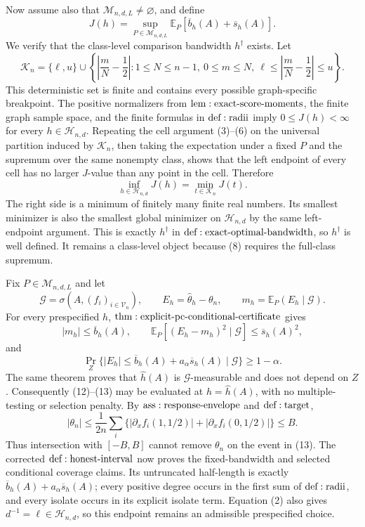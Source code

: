 Now assume also that \(\mathcal M_{n,d,L}\ne\varnothing\), and define
\[
 J(h)=\sup_{P\in\mathcal M_{n,d,L}}
 \mathbb E_P[\overline b_h(A)+\overline s_h(A)].
\tag{8}
\]
We verify that the class-level comparison bandwidth \(h^\dagger\) exists.  Let
\[
 \mathcal K_n=\{\ell,u\}\cup
 \left\{\left|\frac mN-\frac12\right|:
 1\leq N\leq n-1,\ 0\leq m\leq N,\
 \ell\leq\left|\frac mN-\frac12\right|\leq u\right\}.
\tag{9}
\]
This deterministic set is finite and contains every possible graph-specific breakpoint.  The positive normalizers from \({\rm lem:exact\text{-}score\text{-}moments}\), the finite graph sample space, and the finite formulas in \({\rm def:radii}\) imply \(0\leq J(h)<\infty\) for every \(h\in\mathcal H_{n,d}\).  Repeating the cell argument (3)--(6) on the universal partition induced by \(\mathcal K_n\), then taking the expectation under a fixed \(P\) and the supremum over the same nonempty class, shows that the left endpoint of every cell has no larger \(J\)-value than any point in the cell.  Therefore
\[
 \inf_{h\in\mathcal H_{n,d}}J(h)=\min_{t\in\mathcal K_n}J(t).
\tag{10}
\]
The right side is a minimum of finitely many finite real numbers.  Its smallest minimizer is also the smallest global minimizer on \(\mathcal H_{n,d}\) by the same left-endpoint argument.  This is exactly \(h^\dagger\) in \({\rm def:exact\text{-}optimal\text{-}bandwidth}\), so \(h^\dagger\) is well defined.  It remains a class-level object because (8) requires the full-class supremum.

Fix \(P\in\mathcal M_{n,d,L}\) and let
\[
 \mathcal G=\sigma\!\left(A,(f_i)_{i\in\mathcal V_n}\right),
 \qquad E_h=\widehat\theta_h-\theta_n,
 \qquad m_h=\mathbb E_P(E_h\mid\mathcal G).
\tag{11}
\]
For every prespecified \(h\), \({\rm thm:explicit\text{-}pc\text{-}conditional\text{-}certificate}\) gives
\[
 |m_h|\leq\overline b_h(A),\qquad
 \mathbb E_P[(E_h-m_h)^2\mid\mathcal G]\leq\overline s_h(A)^2,
\tag{12}
\]
and
\[
 \Pr_Z\{|E_h|\leq\overline b_h(A)+a_\alpha\overline s_h(A)\mid\mathcal G\}
 \geq1-\alpha.
\tag{13}
\]
The same theorem proves that \(\widehat h(A)\) is \(\mathcal G\)-measurable and does not depend on \(Z\).  Consequently (12)--(13) may be evaluated at \(h=\widehat h(A)\), with no multiple-testing or selection penalty.  By \({\rm ass:response\text{-}envelope}\) and \({\rm def:target}\),
\[
 |\theta_n|
 \leq\frac1{2n}\sum_i
 \{|\partial_xf_i(1,1/2)|+|\partial_xf_i(0,1/2)|\}
 \leq B.
\tag{14}
\]
Thus intersection with \([-B,B]\) cannot remove \(\theta_n\) on the event in (13).  The corrected \({\rm def:honest\text{-}interval}\) now proves the fixed-bandwidth and selected conditional coverage claims.  Its untruncated half-length is exactly \(\overline b_h(A)+a_\alpha\overline s_h(A)\); every positive degree occurs in the first sum of \({\rm def:radii}\), and every isolate occurs in its explicit isolate term.  Equation (2) also gives \(d^{-1}=\ell\in\mathcal H_{n,d}\), so this endpoint remains an admissible prespecified choice.


